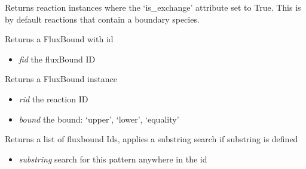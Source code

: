 \documentclass[a4paper,11pt,english]{sphinxmanual}
\begin{document}
\begin{fulllineitems}
\begin{fulllineitems}
\end{fulllineitems}


\begin{fulllineitems}
\label{modules_doc:cbmpy.CBModel.Model.getExchangeReactions}
Returns reaction instances where the `is\_exchange' attribute set to True. This is by default
reactions that contain a boundary species.

\end{fulllineitems}


\begin{fulllineitems}
\label{modules_doc:cbmpy.CBModel.Model.getFluxBoundByID}
Returns a FluxBound with id
\begin{itemize}
\item {} 
\emph{fid} the fluxBound ID

\end{itemize}

\end{fulllineitems}


\begin{fulllineitems}
\label{modules_doc:cbmpy.CBModel.Model.getFluxBoundByReactionID}
Returns a FluxBound instance
\begin{itemize}
\item {} 
\emph{rid} the reaction ID

\item {} 
\emph{bound} the bound: `upper', `lower', `equality'

\end{itemize}

\end{fulllineitems}


\begin{fulllineitems}
\label{modules_doc:cbmpy.CBModel.Model.getFluxBoundIds}
Returns a list of fluxbound Ids, applies a substring search if substring is defined
\begin{itemize}
\item {} 
\emph{substring} search for this pattern anywhere in the id


\end{itemize}
\end{fulllineitems}
\end{fulllineitems}
\end{document}
